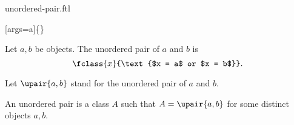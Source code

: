 \documentclass{article}
\begin{document}
\begin{smodule}[creators={Marcel Schütz}]{unordered-pair.ftl}

  [args=a]{\comp\{\comp\}}

  \begin{fdefinition*}[label=3471035364016128]
    Let $a, b$ be objects.
    The unordered pair of $a$ and $b$ is
    \[\fclass{x}{\text{$x = a$ or $x = b$}}.\]
  \end{fdefinition*}

  \begin{fconvention*}
    Let $\upair{a,b}$ stand for the unordered pair of $a$ and $b$.
  \end{fconvention*}

  \begin{fdefinition*}[label=605432672419840]
    An unordered pair is a class $A$ such that $A = \upair{a,b}$ for some distinct objects $a, b$.
  \end{fdefinition*}
\end{smodule}
\end{document}
